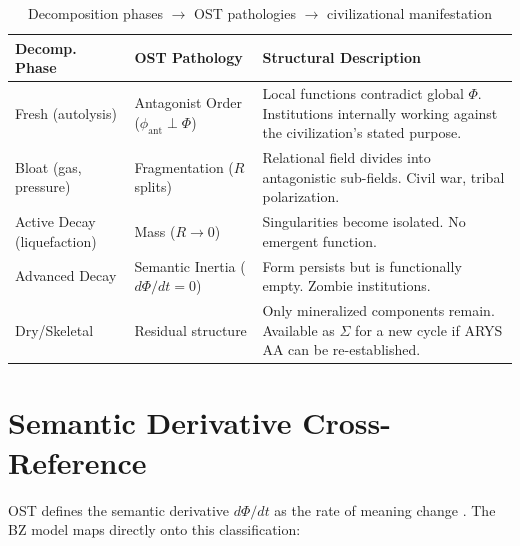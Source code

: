 \documentclass[12pt,a4paper]{article}
\begin{document}
\begin{table}[H]
\centering
\caption{Decomposition phases $\to$ OST pathologies $\to$ civilizational manifestation}
\label{tab:decomp_ost}
\begin{tabular}{@{}p{2.3cm}p{3.2cm}p{6.5cm}@{}}
\toprule
\textbf{Decomp. Phase} & \textbf{OST Pathology} & \textbf{Structural Description} \\
\midrule
Fresh \newline (autolysis) & Antagonist Order \newline ($\phi_{\text{ant}} \perp \Phi$) & Local functions contradict global $\Phi$. Institutions internally working against the civilization's stated purpose. \\[0.5em]
Bloat \newline (gas, pressure) & Fragmentation \newline ($R$ splits) & Relational field divides into antagonistic sub-fields. Civil war, tribal polarization. \\[0.5em]
Active Decay \newline (liquefaction) & Mass \newline ($R \to 0$) & Singularities become isolated. No emergent function. \\[0.5em]
Advanced Decay & Semantic Inertia \newline ($d\Phi/dt = 0$) & Form persists but is functionally empty. Zombie institutions. \\[0.5em]
Dry/Skeletal & Residual structure & Only mineralized components remain. Available as $\Sigma$ for a new cycle if ARYS AA can be re-established. \\
\bottomrule
\end{tabular}
\end{table}


\section{Semantic Derivative Cross-Reference}\label{sec:semantic_derivative}

OST defines the semantic derivative $d\Phi/dt$ as the rate of meaning change \cite{ost_v21}. The BZ model maps directly onto this classification:
\end{document}
